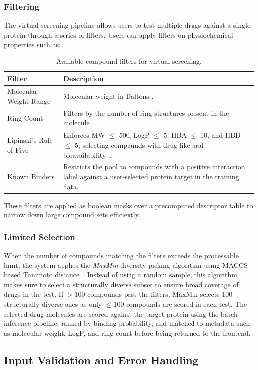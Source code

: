 \subsubsection{Filtering}
The virtual screening pipeline allows users to test multiple drugs against a single protein through a series of filters.
Users can apply filters on physiochemical properties such as:
\begin{table}[H]
\centering
\caption{Available compound filters for virtual screening.}
\label{tab:filters}
\begin{tabular}{lp{8cm}}
\hline
\textbf{Filter} & \textbf{Description} \\
\hline
Molecular Weight Range & Molecular weight in Daltons \citep{lipinski2001, veber2002}. \\
Ring Count & Filters by the number of ring structures present in the molecule \citep{bemis1996}. \\
Lipinski's Rule of Five & Enforces MW $\leq$ 500, LogP $\leq$ 5, HBA $\leq$ 10, and HBD $\leq$ 5, selecting compounds with drug-like oral bioavailability~\citep{lipinski2001}. \\
Known Binders & Restricts the pool to compounds with a positive interaction label against a user-selected protein target in the training data. \\
\hline
\end{tabular}
\end{table}
These filters are applied as boolean masks over a precomputed descriptor table to narrow down large compound sets efficiently.
\subsubsection{Limited Selection}
When the number of compounds matching the filters exceeds the processable limit, the system applies the \textit{MaxMin} diversity-picking algorithm using MACCS-based Tanimoto distance~\citep{tanimoto}.
Instead of using a random sample, this algorithm makes sure to select a structurally diverse subset to ensure broad coverage of drugs in the test.
If $>100$ compounds pass the filters, MaxMin selects 100 structurally diverse ones as only $\leq 100$ compounds are scored in each test.
The selected drug molecules are scored against the target protein using the batch inference pipeline, ranked by binding probability, and matched to metadata such as molecular weight, LogP, and ring count before being returned to the frontend.

\subsection{Input Validation and Error Handling}
